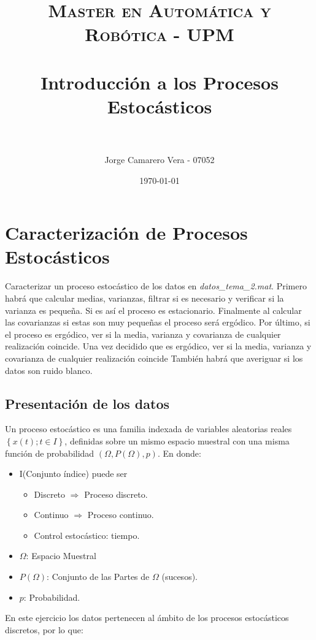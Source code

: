 \documentclass[a4paper, fontsize=11pt]{scrartcl} %
\title{	
	\normalfont \normalsize 
	\textsc{Master en Automática y Robótica - UPM} \\ [25pt] %
	\horrule{0.5pt} \\[0.4cm] %
	\huge Introducción a los Procesos Estocásticos \\ %
	\horrule{2pt} \\[0.5cm] %
}
\author{Jorge Camarero Vera - 07052} %
\date{\normalsize\today} %
\numberwithin{equation}{section} %
\numberwithin{figure}{section} %
\numberwithin{table}{section} %
\begin{document}
	\maketitle
	
	\section{Caracterización de Procesos Estocásticos}
	
	Caracterizar un proceso estocástico de los datos en \textit{datos\_tema\_2.mat}. Primero habrá que calcular medias, varianzas, filtrar si es necesario y verificar si la varianza es pequeña. Si es así el proceso es estacionario. Finalmente al calcular las covarianzas si estas son muy pequeñas el proceso será ergódico. Por último, si el proceso es ergódico, ver si la media, varianza y covarianza de cualquier realización coincide. Una vez decidido que es ergódico, ver si la media, varianza y covarianza de cualquier realización coincide También habrá que averiguar si los datos son ruido blanco.
	
	\subsection{Presentación de los datos}
	
	Un proceso estocástico es una familia indexada de variables aleatorias reales $\left\lbrace x(t); t\in I \right\rbrace$, definidas sobre un mismo espacio muestral con una misma función de probabilidad $\left( \Omega, P(\Omega),p \right) $. En donde:
	
	\begin{itemize}
		\item I(Conjunto índice) puede ser
			\begin{itemize}
				\item Discreto $\Longrightarrow$ Proceso discreto.
				\item Continuo $\Longrightarrow$ Proceso continuo.
				\item Control estocástico: tiempo.
			\end{itemize}
		\item $\Omega$: Espacio Muestral
		\item $P(\Omega)$: Conjunto de las Partes de $\Omega$ (sucesos).
		\item $p$: Probabilidad.
	\end{itemize}
	
	En este ejercicio los datos pertenecen al ámbito de los procesos estocásticos discretos, por lo que:
	
\end{document}
